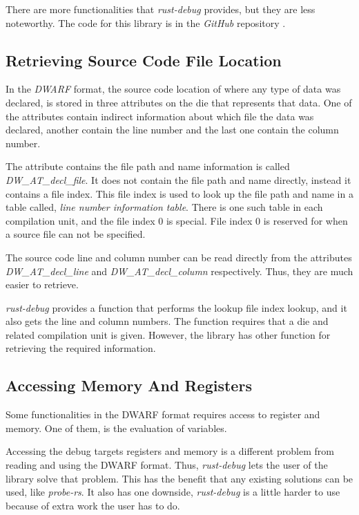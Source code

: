 There are more functionalities that \emph{rust-debug} provides, but they are less noteworthy.
The code for this library is in the \emph{GitHub} repository \cite{rust-debug}.



\subsection{Retrieving Source Code File Location} \label{sec:decl}
In the \emph{DWARF} format, the source code location of where any type of data was declared, is stored in three attributes on the \gls{die} that represents that data.
One of the attributes contain indirect information about which file the data was declared, another contain the line number and the last one contain the column number.


The attribute contains the file path and name information is called \emph{DW\_AT\_decl\_file}.
It does not contain the file path and name directly, instead it contains a file index.
This file index is used to look up the file path and name in a table called, \emph{line number information table}.
There is one such table in each compilation unit, and the file index $0$ is special.
File index $0$ is reserved for when a source file can not be specified.


The source code line and column number can be read directly from the attributes \emph{DW\_AT\_decl\_line} and \emph{DW\_AT\_decl\_column} respectively.
Thus, they are much easier to retrieve.


\emph{rust-debug} provides a function that performs the lookup file index lookup, and it also gets the line and column numbers.
The function requires that a \gls{die} and related compilation unit is given.
However, the library has other function for retrieving the required information.


\subsection{Accessing Memory And Registers}
Some functionalities in the \gls{DWARF} format requires access to register and memory.
One of them, is the evaluation of variables.


Accessing the debug targets registers and memory is a different problem from reading and using the \gls{DWARF} format.
Thus, \emph{rust-debug} lets the user of the library solve that problem.
This has the benefit that any existing solutions can be used, like \emph{probe-rs}.
It also has one downside, \emph{rust-debug} is a little harder to use because of extra work the user has to do.


